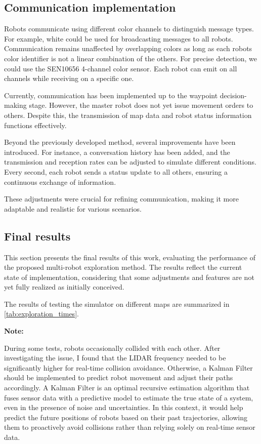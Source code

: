 \documentclass[../main.tex]{subfiles}
\begin{document}
\subsection{Communication implementation}


Robots communicate using different color channels to distinguish message types. For example, white could be used for broadcasting messages to all robots. Communication remains unaffected by overlapping colors as long as each robots color identifier is not a linear combination of the others. For precise detection, we could use the SEN10656 4-channel color sensor. Each robot can emit on all channels while receiving on a specific one.

\vspace{1em}

Currently, communication has been implemented up to the waypoint decision-making stage. However, the master robot does not yet issue movement orders to others. Despite this, the transmission of map data and robot status information functions effectively.

\vspace{1em}

Beyond the previously developed method, several improvements have been introduced. For instance, a conversation history has been added, and the transmission and reception rates can be adjusted to simulate different conditions. Every second, each robot sends a status update to all others, ensuring a continuous exchange of information.

\vspace{1em}

These adjustments were crucial for refining communication, making it more adaptable and realistic for various scenarios.


\subsection{Final results}

This section presents the final results of this work, evaluating the performance of the proposed multi-robot exploration method. The results reflect the current state of implementation, considering that some adjustments and features are not yet fully realized as initially conceived.

The results of testing the simulator on different maps are summarized in \autoref{tab:exploration_times}.

\textbf{Note:}

During some tests, robots occasionally collided with each other. After investigating the issue, I found that the LIDAR frequency needed to be significantly higher for real-time collision avoidance. Otherwise, a Kalman Filter should be implemented to predict robot movement and adjust their paths accordingly. A Kalman Filter is an optimal recursive estimation algorithm that fuses sensor data with a predictive model to estimate the true state of a system, even in the presence of noise and uncertainties. In this context, it would help predict the future positions of robots based on their past trajectories, allowing them to proactively avoid collisions rather than relying solely on real-time sensor data.
\end{document}
